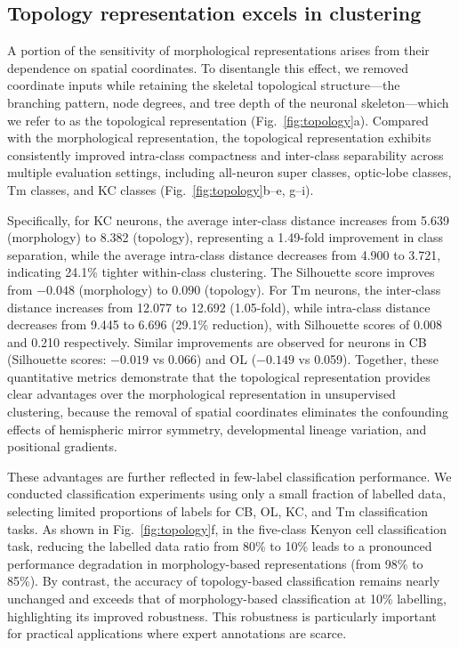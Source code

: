 \documentclass[10pt]{article}
\begin{document}
\subsection*{Topology representation excels in clustering}

A portion of the sensitivity of morphological representations arises from their dependence on spatial coordinates. To disentangle this effect, we removed coordinate inputs while retaining the skeletal topological structure---the branching pattern, node degrees, and tree depth of the neuronal skeleton---which we refer to as the topological representation (Fig.~\ref{fig:topology}a). Compared with the morphological representation, the topological representation exhibits consistently improved intra-class compactness and inter-class separability across multiple evaluation settings, including all-neuron super classes, optic-lobe classes, Tm classes, and KC classes (Fig.~\ref{fig:topology}b--e, g--i).

Specifically, for KC neurons, the average inter-class distance increases from 5.639 (morphology) to 8.382 (topology), representing a 1.49-fold improvement in class separation, while the average intra-class distance decreases from 4.900 to 3.721, indicating 24.1\% tighter within-class clustering. The Silhouette score improves from $-0.048$ (morphology) to $0.090$ (topology). For Tm neurons, the inter-class distance increases from 12.077 to 12.692 (1.05-fold), while intra-class distance decreases from 9.445 to 6.696 (29.1\% reduction), with Silhouette scores of 0.008 and 0.210 respectively. Similar improvements are observed for neurons in CB (Silhouette scores: $-0.019$ vs 0.066) and OL ($-0.149$ vs 0.059). Together, these quantitative metrics demonstrate that the topological representation provides clear advantages over the morphological representation in unsupervised clustering, because the removal of spatial coordinates eliminates the confounding effects of hemispheric mirror symmetry, developmental lineage variation, and positional gradients.

These advantages are further reflected in few-label classification performance. We conducted classification experiments using only a small fraction of labelled data, selecting limited proportions of labels for CB, OL, KC, and Tm classification tasks. As shown in Fig.~\ref{fig:topology}f, in the five-class Kenyon cell classification task, reducing the labelled data ratio from 80\% to 10\% leads to a pronounced performance degradation in morphology-based representations (from 98\% to 85\%). By contrast, the accuracy of topology-based classification remains nearly unchanged and exceeds that of morphology-based classification at 10\% labelling, highlighting its improved robustness. This robustness is particularly important for practical applications where expert annotations are scarce.
\end{document}
